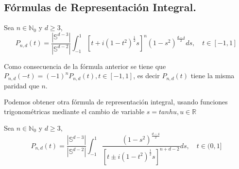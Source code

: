 \subsection{Fórmulas de Representación Integral.}
\begin{thm}Sea $n\in\mathds{N}_0$ y $d\ge3$, $$ 
	P_{n,d}(t) = \frac{|\mathds{S}^{d-3}|}{|\mathds{S}^{d-2}|}\int_{-1}^{1}[t+i(1-t^2)^{\frac{1}{2}}s]^n(1-s^2)^{\frac{d-4}{2}} ds, \quad t\in[-1,1]
	$$
\end{thm}
\begin{rem}Como consecuencia de la fórmula anterior se tiene que $P_{n,d}(-t) = (-1)^n P_{n,d}(t), t\in[-1,1]$, es decir $P_{n,d}(t)$ tiene la misma paridad que $n$.
\end{rem}
Podemos obtener otra fórmula de representación integral, usando funciones trigonométricas mediante el cambio de variable $s = tanh u, u\in\mathds{R}$
\begin{thm}Sea $n\in\mathds{N}_0$ y $d\ge3$, $$
		P_{n,d}(t) = \frac{|\mathds{S}^{d-3}|}{|\mathds{S}^{d-2}|}\int_{-1}^{1}\frac{(1-s^2)^{\frac{d-4}{2}}}{[t\pm i(1-t^2)^{\frac{1}{2}}s]^{n+d-2}} ds, \quad t\in(0,1]
	$$
\end{thm}
